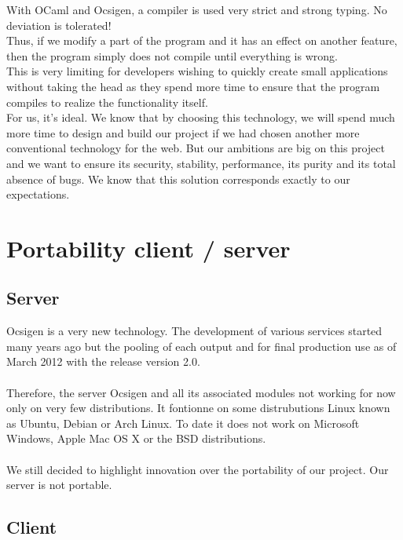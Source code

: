 \documentclass {life-en}
\begin{document}
\newpage

With OCaml and Ocsigen, a compiler is used very strict and strong typing. No deviation is tolerated!\\
Thus, if we modify a part of the program and it has an effect on another feature, then the program simply does not compile until everything is wrong.\\

This is very limiting for developers wishing to quickly create small applications without taking the head as they spend more time to ensure that the program compiles to realize the functionality itself.\\
For us, it's ideal. We know that by choosing this technology, we will spend much more time to design and build our project if we had chosen another more conventional technology for the web. But our ambitions are big on this project and we want to ensure its security, stability, performance, its purity and its total absence of bugs. We know that this solution corresponds exactly to our expectations.
\\

\section{Portability client / server}

\subsection{Server}

Ocsigen is a very new technology. The development of various services
started many years ago but the pooling of each output and
for final production use as of March 2012 with the release
version 2.0.\\
\\
Therefore, the server Ocsigen and all its associated modules not working
for now only on very few distributions. It fontionne on some
distrubutions Linux known as Ubuntu, Debian or Arch Linux. To date 
it does not work on Microsoft Windows, Apple Mac OS X or the 
BSD distributions. \\
\\
We still decided to highlight innovation over
the portability of our project. Our server is not portable.

\subsection{Client}
\end{document}
